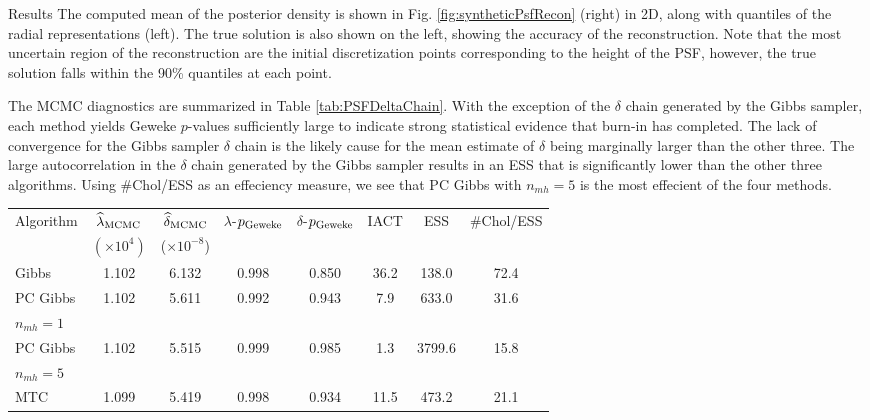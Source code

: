 \begin{chapter}{Results}
The computed mean of the posterior density is shown in Fig. \ref{fig:syntheticPsfRecon} (right) in 2D, along with quantiles of the radial representations (left). 
The true solution is also shown on the left, showing the accuracy of the reconstruction.  
Note that the most uncertain region of the reconstruction are the initial discretization points corresponding to the height of the PSF, however, the true solution falls within the 90\% quantiles at each point.

The MCMC diagnostics are summarized in Table \ref{tab:PSFDeltaChain}. With the exception of the $\delta$ chain generated by the Gibbs sampler, each method yields Geweke $p$-values sufficiently large to indicate strong statistical evidence that burn-in has completed. The lack of convergence for the Gibbs sampler $\delta$ chain is the likely cause for the mean estimate of $\delta$ being marginally larger than the other three. The large autocorrelation in the $\delta$ chain generated by the Gibbs sampler results in an ESS that is significantly lower than the other three algorithms. Using \#Chol/ESS as an effeciency measure, we see that PC Gibbs with $n_{mh}=5$ is the most effecient of the four methods.
\begin{table}[h]
\begin{center}
  \begin{tabular}{l|ccccccc}
    \hline
    Algorithm       & $\hat{\lambda}_{\rm MCMC}$& $\hat{\delta}_{\rm MCMC}$  & $\lambda$-$p_{\rm Geweke}$&$\delta$-$p_{\rm Geweke}$& IACT & ESS    & \#Chol/ESS \\
     & $(\times 10^{4})$ & ($\times 10^{-8}$) & & \\
    \hline
	      Gibbs &                 1.102 &                 6.132 &                    0.998 &                    0.850& 36.2 &  138.0 &      72.4 \\
PC Gibbs &                 1.102 &                 5.611 &                    0.992 &                    0.943&  7.9 &  633.0 &      31.6 \\
\hspace{.2in} $n_{mh}= 1$ & & & & & & & \\
PC Gibbs &                 1.102 &                 5.515&                    0.999 &                    0.985&  1.3 & 3799.6 &      15.8 \\
\hspace{.2in} $n_{mh}= 5$ & & & & & & & \\
		MTC &                 1.099 &                 5.419 &                    0.998 &                    0.934& 11.5 &  473.2 &      21.1 \\

\end{tabular}
\end{center}
\end{table}
\end{chapter}
